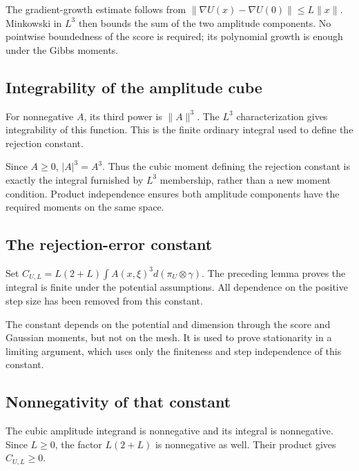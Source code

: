 \documentclass[11pt,a4paper]{report}
\begin{document}
The gradient-growth estimate follows from \(\|\nabla U(x)-\nabla U(0)\|\le L\|x\|\). Minkowski in \(L^3\) then bounds the sum of the two amplitude components. No pointwise boundedness of the score is required; its polynomial growth is enough under the Gibbs moments.

\subsection{\texorpdfstring{Integrability of the amplitude cube}{Integrability of the amplitude cube}}
\label{report-step-UnadjustedLangevin-MALAError-lean-21}


For nonnegative \(A\), its third power is \(\|A\|^3\). The \(L^3\) characterization gives integrability of this function. This is the finite ordinary integral used to define the rejection constant.



Since \(A\ge0\), \(|A|^3=A^3\). Thus the cubic moment defining the rejection constant is exactly the integral furnished by \(L^3\) membership, rather than a new moment condition. Product independence ensures both amplitude components have the required moments on the same space.

\subsection{\texorpdfstring{The rejection-error constant}{The rejection-error constant}}
\label{report-step-UnadjustedLangevin-MALAError-lean-22}


Set \(C_{U,L}=L(2+L)\int A(x,\xi)^3d(\pi_U\otimes\gamma)\). The preceding lemma proves the integral is finite under the potential assumptions. All dependence on the positive step size has been removed from this constant.



The constant depends on the potential and dimension through the score and Gaussian moments, but not on the mesh. It is used to prove stationarity in a limiting argument, which uses only the finiteness and step independence of this constant.

\subsection{\texorpdfstring{Nonnegativity of that constant}{Nonnegativity of that constant}}
\label{report-step-UnadjustedLangevin-MALAError-lean-23}


The cubic amplitude integrand is nonnegative and its integral is nonnegative. Since \(L\ge0\), the factor \(L(2+L)\) is nonnegative as well. Their product gives \(C_{U,L}\ge0\).
\end{document}
